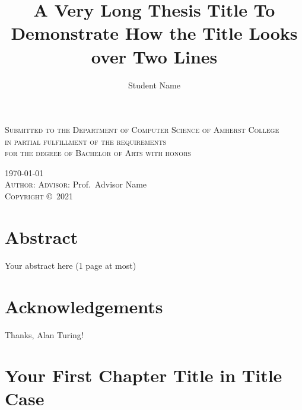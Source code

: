 \documentclass[11pt,twoside,openright]{report}
\author{Student Name}
\title{A Very Long Thesis Title To Demonstrate How the Title Looks over Two Lines}
\newcommand{\graduationyear}{2021} %
\newcommand{\advisor}{Advisor Name} %
\begin{document}

\begin{titlepage}
  \centering
  {\LARGE\makeatletter\textbf{\MakeUppercase\@title}\makeatother}\par
  \vspace{0.6\baselineskip}
  {\scshape Submitted to the Department of Computer Science of Amherst
    College\\[0.5\baselineskip]
    in partial fulfillment of the requirements \\[0.5\baselineskip]
    for the degree of Bachelor of Arts with honors
  }\par
  \vspace{0.6\baselineskip}
  \textsc{\today}\\[1in] %
  \vspace{8\baselineskip}
  {\textsc{Author:} \makeatletter\@author\makeatother%
  \hfill\textsc{Advisor:} Prof.\ \advisor}\\[0.6\baselineskip]
  \vfill
  \textsc{Copyright} \copyright\ \textsc{\graduationyear}\ %
  {\scshape \makeatletter\@author\makeatother}
\end{titlepage}


\chapter*{Abstract} %

Your abstract here (1 page at most)

\chapter*{Acknowledgements} %

Thanks, Alan Turing!

\tableofcontents %

\doublespacing%

\chapter{Your First Chapter Title in Title Case}

\lipsum%


\end{document}
